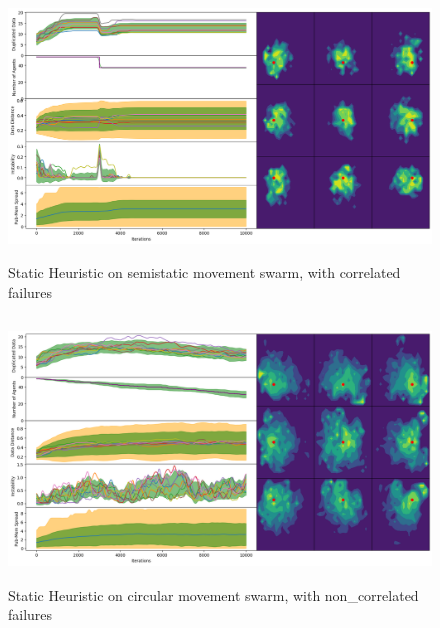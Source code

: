 \documentclass{UoYCSproject}
\begin{document}
\begin{figure}[htb]
\label{fig:static_movement_con}
\begin{center}
\centering
\includegraphics[height=7cm]{"./Static_Heuristic/Static_Movement_concurrent.png"}
\caption{Static Heuristic on semi\-static movement swarm, with correlated failures}
\end{center}
\end{figure}

\begin{figure}[htb]
\label{fig:circle_movement_non}
\begin{center}
\centering
\includegraphics[height=7cm]{"./Static_Heuristic/Circle_movement_non.png"}
\caption{Static Heuristic on circular movement swarm, with non\_correlated failures}
\end{center}
\end{figure}
\end{document}
